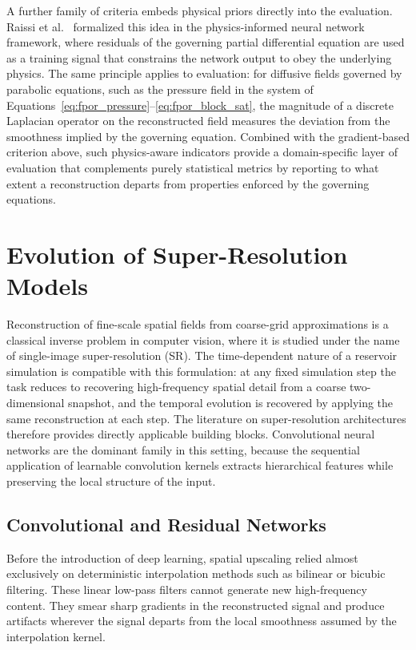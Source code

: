 A further family of criteria embeds physical priors directly into the evaluation. Raissi et al.~\cite{arxiv_raissi_pinns} formalized this idea in the physics-informed neural network framework, where residuals of the governing partial differential equation are used as a training signal that constrains the network output to obey the underlying physics. The same principle applies to evaluation: for diffusive fields governed by parabolic equations, such as the pressure field in the system of Equations~\ref{eq:fpor_pressure}--\ref{eq:fpor_block_sat}, the magnitude of a discrete Laplacian operator on the reconstructed field measures the deviation from the smoothness implied by the governing equation. Combined with the gradient-based criterion above, such physics-aware indicators provide a domain-specific layer of evaluation that complements purely statistical metrics by reporting to what extent a reconstruction departs from properties enforced by the governing equations.


\section{Evolution of Super-Resolution Models}
\label{sec:dl_architectures}

Reconstruction of fine-scale spatial fields from coarse-grid approximations is a classical inverse problem in computer vision, where it is studied under the name of single-image super-resolution (SR). The time-dependent nature of a reservoir simulation is compatible with this formulation: at any fixed simulation step the task reduces to recovering high-frequency spatial detail from a coarse two-dimensional snapshot, and the temporal evolution is recovered by applying the same reconstruction at each step. The literature on super-resolution architectures therefore provides directly applicable building blocks. Convolutional neural networks are the dominant family in this setting, because the sequential application of learnable convolution kernels extracts hierarchical features while preserving the local structure of the input.

\subsection{Convolutional and Residual Networks}
\label{subsec:dl_foundations}

Before the introduction of deep learning, spatial upscaling relied almost exclusively on deterministic interpolation methods such as bilinear or bicubic filtering. These linear low-pass filters cannot generate new high-frequency content. They smear sharp gradients in the reconstructed signal and produce artifacts wherever the signal departs from the local smoothness assumed by the interpolation kernel.

